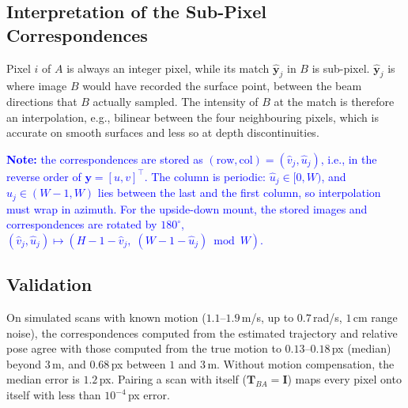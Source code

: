 \subsection{Interpretation of the Sub-Pixel Correspondences}
Pixel $i$ of $A$ is always an integer pixel, while its match $\hat{\mathbf{y}}_j$ in $B$ is sub-pixel. $\hat{\mathbf{y}}_j$ is where image $B$ would have recorded the surface point, between the beam directions that $B$ actually sampled. The intensity of $B$ at the match is therefore an interpolation, e.g., bilinear between the four neighbouring pixels, which is accurate on smooth surfaces and less so at depth discontinuities.

\textcolor{blue}{\textbf{Note:} the correspondences are stored as $(\text{row}, \text{col}) = (\hat{v}_j, \hat{u}_j)$, i.e., in the reverse order of $\mathbf{y} = [u, v]^{\top}$. The column is periodic: $\hat{u}_j \in [0, W)$, and $\hat{u}_j \in (W-1, W)$ lies between the last and the first column, so interpolation must wrap in azimuth. For the upside-down mount, the stored images and correspondences are rotated by $180^{\circ}$, $(\hat{v}_j, \hat{u}_j) \mapsto (H - 1 - \hat{v}_j,\; (W - 1 - \hat{u}_j) \bmod W)$.}

\subsection{Validation}
On simulated scans with known motion ($1.1$--$1.9$\,m/s, up to $0.7$\,rad/s, $1$\,cm range noise), the correspondences computed from the estimated trajectory and relative pose agree with those computed from the true motion to $0.13$--$0.18$\,px (median) beyond $3$\,m, and $0.68$\,px between $1$ and $3$\,m. Without motion compensation, the median error is $1.2$\,px. Pairing a scan with itself ($\mathbf{T}_{BA} = \mathbf{I}$) maps every pixel onto itself with less than $10^{-4}$\,px error.

